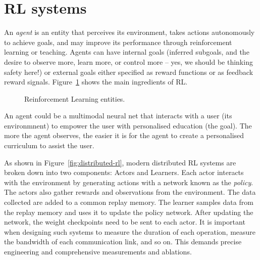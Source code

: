 \documentclass{article}
\begin{document}
\section{RL systems}

An \emph{agent} is an entity that perceives its environment, takes actions autonomously to achieve goals, and may improve its performance through reinforcement learning or teaching. Agents can have internal goals (inferred subgoals, and the desire to observe more, learn more, or control more -- yes, we should be thinking safety here!) or external goals either specified as reward functions or as feedback reward signals. Figure~\ref{fig:rl-framework} shows the main ingredients of RL.
\begin{figure}[h]
    \centering
    \caption{Reinforcement Learning entities.}
    \label{fig:rl-framework}
\end{figure}


An agent could be a multimodal neural net that interacts with a user (its environmnent) to empower the user with personalised education (the goal). The more the agent observes, the easier it is for the agent to create a personalised curriculum to assist the user.

As shown in Figure~\ref{fig:distributed-rl}, modern distributed RL systems are broken down into two components: Actors and Learners. Each actor interacts with the environment by generating actions with a network known as the \emph{policy}. The actors also gather rewards and observations from the environment. The data collected are added to a common replay memory. The learner samples data from the replay memory and uses it to update the policy network. After updating the network, the weight checkpoints need to be sent to each actor. It is important when designing such systems to measure the duration of each operation, measure the bandwidth of each communication link, and so on. This demands precise engineering and comprehensive measurements and ablations.
\end{document}
